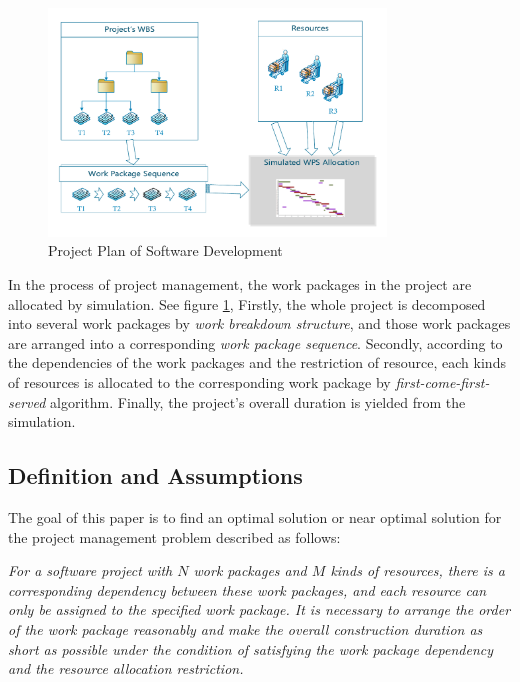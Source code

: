 \begin{figure}[!ht]
  \centering
  \vspace{-3mm}
  \includegraphics[width=0.8\textwidth]{figures/simu.pdf}
  \vspace{-5mm}
  \caption{Project Plan of Software Development}
  \label{fig:simu}
\vspace{-5mm}
\end{figure}


 In the process of project management, the work packages in the project are
 allocated by simulation. See figure \ref{fig:simu}, Firstly, the whole project
 is decomposed into several work packages by \emph{work breakdown structure},
 and those work packages are arranged into a corresponding \emph{work package
   sequence}. Secondly, according to the dependencies of the work packages and
 the restriction of resource, each kinds of resources is allocated to the
 corresponding work package by \emph{first-come-first-served}
 algorithm. Finally, the project's overall duration is yielded from the simulation.



\subsection{Definition and Assumptions}
%
The goal of this paper is to find an optimal solution or near optimal
solution for the project management problem described as follows:


\emph{
  For a software project with $N$ work packages and $M$ kinds of resources,
  there is a corresponding dependency between these work packages, and each
  resource can only be assigned to the specified work package.  It is necessary
  to arrange the order of the work package reasonably and make the overall
  construction duration as short as possible under the condition of satisfying
  the work package dependency and the resource allocation restriction.
}

